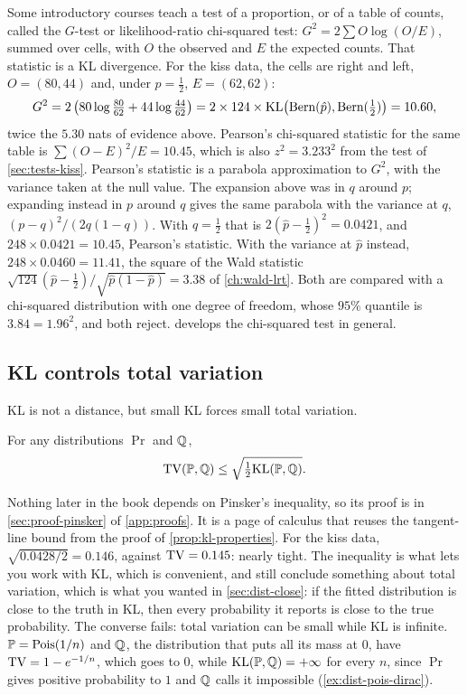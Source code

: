 \begin{bridge}
Some introductory courses teach a test of a proportion, or of a table of counts, called the $G$-test or likelihood-ratio chi-squared test: $G^2 = 2\sum O \log(O/E)$, summed over cells, with $O$ the observed and $E$ the expected counts.
That statistic is a KL divergence.
For the kiss data, the cells are right and left, $O = (80, 44)$ and, under $p = \frac12$, $E = (62, 62)$:
\[
G^2 = 2\left(80 \log \tfrac{80}{62} + 44 \log \tfrac{44}{62}\right) = 2 \times 124 \times \mathrm{KL}\big(\text{Bern}(\hat{p}), \text{Bern}(\tfrac12)\big) = 10.60,
\]
twice the $5.30$ nats of evidence above.
Pearson's chi-squared statistic for the same table is $\sum (O - E)^2/E = 10.45$, which is also $z^2 = 3.233^2$ from the test of \cref{sec:tests-kiss}.
Pearson's statistic is a parabola approximation to $G^2$, with the variance taken at the null value.
The expansion above was in $q$ around $p$; expanding instead in $p$ around $q$ gives the same parabola with the variance at $q$, $(p - q)^2/(2q(1 - q))$.
With $q = \frac12$ that is $2(\hat{p} - \frac12)^2 = 0.0421$, and $248 \times 0.0421 = 10.45$, Pearson's statistic.
With the variance at $\hat{p}$ instead, $248 \times 0.0460 = 11.41$, the square of the Wald statistic $\sqrt{124}(\hat{p} - \frac12)/\sqrt{\hat{p}(1 - \hat{p})} = 3.38$ of \cref{ch:wald-lrt}.
Both are compared with a chi-squared distribution with one degree of freedom, whose $95\%$ quantile is $3.84 = 1.96^2$, and both reject.
 develops the chi-squared test in general.
\end{bridge}

\subsection{KL controls total variation}

KL is not a distance, but small KL forces small total variation.

\begin{theorem}
\label{thm:pinsker}
For any distributions $\Pr$ and $\mathbb{Q}$,
\[
\mathrm{TV}(\mathbb{P}, \mathbb{Q}) \leq \sqrt{\tfrac12 \mathrm{KL}(\mathbb{P}, \mathbb{Q})}.
\]
\end{theorem}

Nothing later in the book depends on Pinsker's inequality, so its proof is in \cref{sec:proof-pinsker} of \cref{app:proofs}. It is a page of calculus that reuses the tangent-line bound from the proof of \cref{prop:kl-properties}.
For the kiss data, $\sqrt{0.0428/2} = 0.146$, against $\mathrm{TV} = 0.145$: nearly tight.
The inequality is what lets you work with KL, which is convenient, and still conclude something about total variation, which is what you wanted in \cref{sec:dist-close}: if the fitted distribution is close to the truth in KL, then every probability it reports is close to the true probability.
The converse fails: total variation can be small while KL is infinite.
$\mathbb{P} = \text{Pois}(1/n)$ and $\mathbb{Q}$, the distribution that puts all its mass at $0$, have $\mathrm{TV} = 1 - e^{-1/n}$, which goes to $0$, while $\mathrm{KL}(\mathbb{P}, \mathbb{Q}) = +\infty$ for every $n$, since $\Pr$ gives positive probability to $1$ and $\mathbb{Q}$ calls it impossible (\cref{ex:dist-pois-dirac}).

